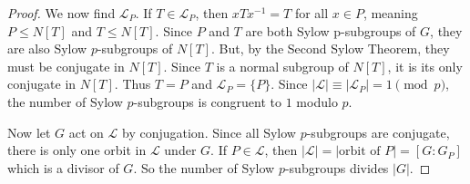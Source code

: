 \documentclass[a4paper,11pt]{article}
\begin{document}
\begin{outline}
\begin{proof}
      We now find \(\mathcal{L}_P\). If \(T \in \mathcal{L}_P\), then \(xTx^{-1} = T\) for all \(x \in P\), 
      meaning \(P \leq N[T]\) and \(T \leq N[T]\). Since \(P\) and \(T\) are both Sylow p-subgroups of \(G\), 
      they are also Sylow \(p\)-subgroups of \(N[T]\). But, by the Second Sylow Theorem, they must be conjugate in 
      \(N[T]\). Since \(T\) is a normal subgroup of \(N[T]\), it is its only conjugate in \(N[T]\). Thus \(T = P\) 
      and \(\mathcal{L}_P = \{P\}\). Since \(|\mathcal{L}| \equiv |\mathcal{L}_P| = 1 \pmod{p}\), the number of 
      Sylow \(p\)-subgroups is congruent to \(1\) modulo \(p\). 
      
      Now let \(G\) act on \(\mathcal{L}\) by conjugation. Since all Sylow \(p\)-subgroups are conjugate, 
      there is only one orbit in \(\mathcal{L}\) under \(G\). If \(P \in \mathcal{L}\), then 
      \(|\mathcal{L}| = |\text{orbit of }P| = [G:G_P]\) which is a divisor of \(G\). So the number of Sylow 
      \(p\)-subgroups divides \(|G|\).
    \end{proof}
      
\end{outline}
\end{document}
